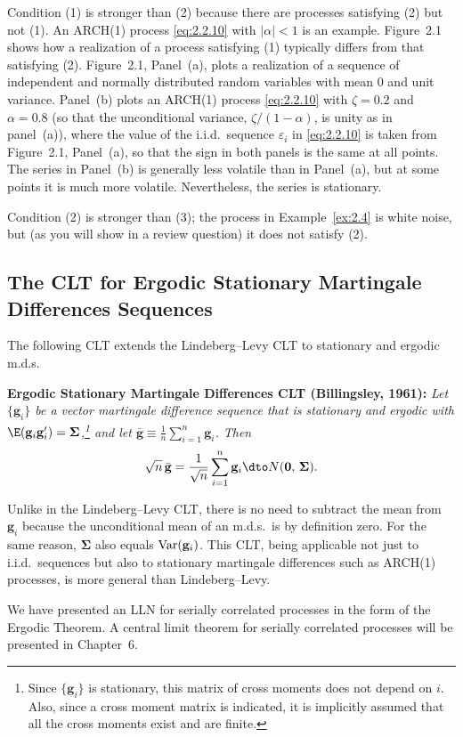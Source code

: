 Condition (1) is stronger than (2) because there are processes satisfying (2) but not
(1).  An ARCH(1) process \eqref{eq:2.2.10} with $|\alpha| < 1$ is an example.
Figure~2.1 shows how a realization of a process satisfying (1) typically differs from
that satisfying (2).  Figure~2.1, Panel~(a), plots a realization of a sequence of
independent and normally distributed random variables with mean 0 and unit variance.
Panel~(b) plots an ARCH(1) process \eqref{eq:2.2.10} with $\zeta = 0.2$ and
$\alpha = 0.8$ (so that the unconditional variance, $\zeta/(1-\alpha)$, is unity as
in panel~(a)), where the value of the i.i.d.\ sequence $\varepsilon_i$ in
\eqref{eq:2.2.10} is taken from Figure~2.1, Panel~(a), so that the sign in both
panels is the same at all points.  The series in Panel~(b) is generally less volatile
than in Panel~(a), but at some points it is much more volatile.  Nevertheless, the
series is stationary.

Condition (2) is stronger than (3); the process in Example~\ref{ex:2.4} is white
noise, but (as you will show in a review question) it does not satisfy (2).


\subsection*{The CLT for Ergodic Stationary Martingale Differences Sequences}

The following CLT extends the Lindeberg--Levy CLT to stationary and ergodic m.d.s.

\medskip
\noindent\textbf{Ergodic Stationary Martingale Differences CLT (Billingsley, 1961):}
\quad\emph{Let $\{\mathbf{g}_i\}$ be a vector martingale difference sequence that is
stationary and ergodic with
$\E(\mathbf{g}_i\mathbf{g}_i') = \bm{\Sigma}$,\footnote{Since $\{\mathbf{g}_i\}$ is
stationary, this matrix of cross moments does not depend on $i$.  Also, since a cross
moment matrix is indicated, it is implicitly assumed that all the cross moments exist
and are finite.} and let
$\bar{\mathbf{g}} \equiv \frac{1}{n}\sum_{i=1}^{n} \mathbf{g}_i$.  Then}
\[
  \sqrt{n}\,\bar{\mathbf{g}}
  = \frac{1}{\sqrt{n}} \sum_{i=1}^{n} \mathbf{g}_i
  \dto N(\mathbf{0},\, \bm{\Sigma}).
\]

Unlike in the Lindeberg--Levy CLT, there is no need to subtract the mean from
$\mathbf{g}_i$ because the unconditional mean of an m.d.s.\ is by definition zero.
For the same reason, $\bm{\Sigma}$ also equals $\operatorname{Var}(\mathbf{g}_i)$.  This CLT,
being applicable not just to i.i.d.\ sequences but also to stationary martingale
differences such as ARCH(1) processes, is more general than Lindeberg--Levy.

We have presented an LLN for serially correlated processes in the form of the
Ergodic Theorem.  A central limit theorem for serially correlated processes will be
presented in Chapter~6.
